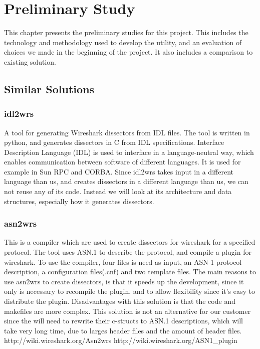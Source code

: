 \chapter{Preliminary Study}
This chapter presents the preliminary studies for this project. This includes
the technology and methodology used to develop the utility, and an evaluation
of choices we made in the beginning of the project. It also includes a
comparison to existing solution.

\section{Similar Solutions}

\subsection{idl2wrs}
A tool for generating Wireshark dissectors from IDL files. The tool is written
in python, and generates dissectors in C from IDL specifications. Interface
Description Language (IDL) is used to interface in a language-neutral way,
which enables communication between software of different languages. It is
used for example in Sun RPC and CORBA. Since idl2wrs takes input in a different
language than us, and creates dissectors in a different language than us, we
can not reuse any of its code. Instead we will look at its architecture and
data structures, especially how it generates dissectors.

\subsection{asn2wrs}
This is a compiler which are used to create dissectors for wireshark for a
specified protocol. The tool uses ASN.1 to describe the protocol, and compile a
plugin for wireshark. To use the compiler, four files is need as input, an
ASN-1 protocol description, a configuration files(.cnf) and two template files.
The main reasons to use asn2wrs to create dissectors, is that it speeds up the
development, since it only is necessary to recompile the plugin, and to allow
flexibility since it’s easy to distribute the plugin. Disadvantages with this
solution is that the code and makefiles are more complex. This solution is not
an alternative for our customer since the will need to rewrite their c-structs
to ASN.1 descriptions, which will take very long time, due to larges header
files and the amount of header files.
http://wiki.wireshark.org/Asn2wrs
http://wiki.wireshark.org/ASN1\_plugin

